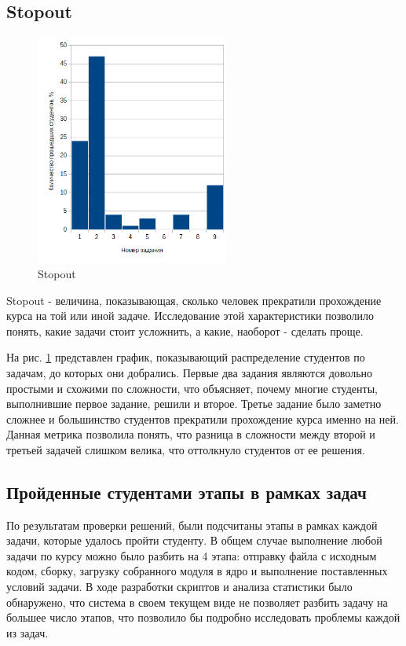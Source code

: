 \subsection{Stopout}

\begin{figure}[!t]
\centering
\includegraphics[width=2.5in]{stopout}
\caption{Stopout}
\label{fig:mesh2}
\end{figure}

Stopout\cite{stopout}\cite{likelytostop} - величина, показывающая, сколько человек прекратили прохождение курса на той или иной задаче. Исследование этой характеристики позволило понять, какие задачи стоит усложнить, а какие, наоборот - сделать проще.

На рис. \ref{fig:mesh2} представлен график, показывающий распределение студентов по задачам, до которых они добрались. Первые два задания являются довольно простыми и схожими по сложности, что объясняет, почему многие студенты, выполнившие первое задание, решили и второе. Третье задание было заметно сложнее и большинство студентов прекратили прохождение курса именно на ней. Данная метрика позволила понять, что разница в сложности между второй и третьей задачей слишком велика, что оттолкнуло студентов от ее решения.

\subsection{Пройденные студентами этапы в рамках задач}
По результатам проверки решений, были подсчитаны этапы в рамках каждой задачи, которые удалось пройти студенту. В общем случае выполнение любой задачи по курсу можно было разбить на 4 этапа: отправку файла с исходным кодом, сборку, загрузку собранного модуля в ядро и выполнение поставленных условий задачи. В ходе разработки скриптов и анализа статистики было обнаружено, что система в своем текущем виде не позволяет разбить задачу на большее число этапов, что позволило бы подробно исследовать проблемы каждой из задач.

